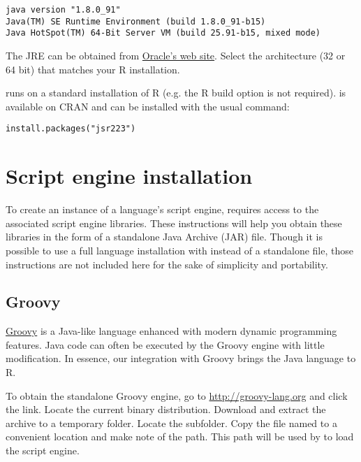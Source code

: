 \begin{verbatim}
java version "1.8.0_91"
Java(TM) SE Runtime Environment (build 1.8.0_91-b15)
Java HotSpot(TM) 64-Bit Server VM (build 25.91-b15, mixed mode)
\end{verbatim}

The JRE can be obtained from  \href{http://www.oracle.com/technetwork/java/javase/downloads/jre8-downloads-2133155.html}{Oracle's web site}. Select the architecture (32 or 64 bit) that matches your R installation.

 runs on a standard installation of R (e.g. the R build option  is not required).  is available on CRAN and can be installed with the usual command:

\begin{verbatim}
install.packages("jsr223")
\end{verbatim}

\section{Script engine installation}

To create an instance of a language's script engine,  requires access to the associated script engine libraries. These instructions will help you obtain these libraries in the form of a standalone Java Archive (JAR) file. Though it is possible to use a full language installation with  instead of a standalone file, those instructions are not included here for the sake of simplicity and portability.

\subsection{Groovy}

\href{http://groovy-lang.org}{Groovy} is a Java-like language enhanced with modern dynamic programming features. Java code can often be executed by the Groovy engine with little modification. In essence, our integration with Groovy brings the Java language to R.

To obtain the standalone Groovy engine, go to \url{http://groovy-lang.org} and click the  link. Locate the current binary distribution. Download and extract the archive to a temporary folder. Locate the  subfolder. Copy the file named  to a convenient location and make note of the path. This path will be used by  to load the script engine.


